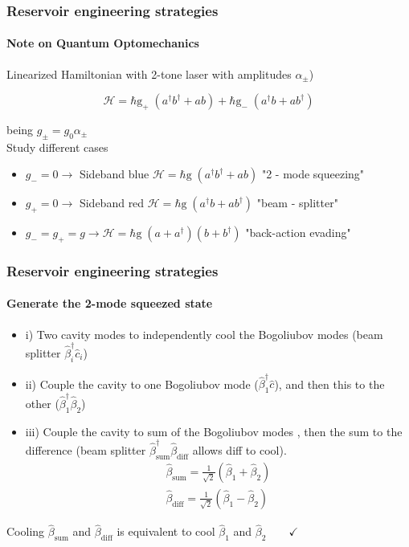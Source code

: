 \documentclass[aspectratio=43]{beamer}
\begin{document}
\begin{frame}
	
	\frametitle{Reservoir engineering strategies}
	\framesubtitle{Note on Quantum Optomechanics}
	
	Linearized Hamiltonian with 2-tone laser with amplitudes $\alpha_{\pm}$)
	
	\begin{equation}
	\mathcal{H} = \hbar \textrm{g}_{+} \; (a^{\dagger}b^{\dagger} + ab) + \hbar \textrm{g}_{-} \; (a^{\dagger}b + ab^{\dagger}) \nonumber
	\end{equation}
	
	being $g_{\pm} = g_{0} \alpha_{\pm}$ \\
	Study different cases
	
	\begin{itemize}
		\item $g_{-} = 0 \longrightarrow$ Sideband blue $\mathcal{H} = \hbar \textrm{g} \; (a^{\dagger}b^{\dagger} + ab)$ "2 - mode squeezing"
		\item $g_{+} = 0 \longrightarrow$ Sideband red $\mathcal{H} = \hbar \textrm{g} \; (a^{\dagger}b + ab^{\dagger})$ "beam - splitter"
		\item $g_{-} = g_{+} = g \longrightarrow \mathcal{H} = \hbar \textrm{g} \; (a + a^{\dagger})(b + b^{\dagger})$ "back-action evading"
	\end{itemize}	

\end{frame}

\begin{frame}
	
	\frametitle{Reservoir engineering strategies}
	\framesubtitle{Generate the 2-mode squeezed state}
	
	\begin{itemize}
		\item i) Two cavity modes to independently cool the Bogoliubov modes (beam splitter $\hat{\beta}^{\dagger}_{i} \hat{c}_{i}$)
		\item ii) Couple the cavity to one Bogoliubov mode  ($\hat{\beta}^{\dagger}_{1} \hat{c}$), and then this to the other ($\hat{\beta}^{\dagger}_{1} \hat{\beta}_{2}$)
		\item iii) Couple the cavity to sum of the Bogoliubov modes , then the sum to the difference (beam splitter $\hat{\beta}^{\dagger}_{\textrm{sum}} \hat{\beta}_{\textrm{diff}}$ allows diff to cool).
		\begin{align}
			\hat{\beta}_{\textrm{sum}} = \frac{1}{\sqrt{2}}(\hat{\beta}_{1} + \hat{\beta}_{2}) \nonumber \\
			\hat{\beta}_{\textrm{diff}} = \frac{1}{\sqrt{2}}(\hat{\beta}_{1} - \hat{\beta}_{2}) \nonumber
		\end{align}
	\end{itemize}

	Cooling $\hat{\beta}_{\textrm{sum}}$ and $\hat{\beta}_{\textrm{diff}}$ is equivalent to cool $\hat{\beta}_{1}$ and $\hat{\beta}_{2} \qquad \checkmark$

\end{frame}
\end{document}
